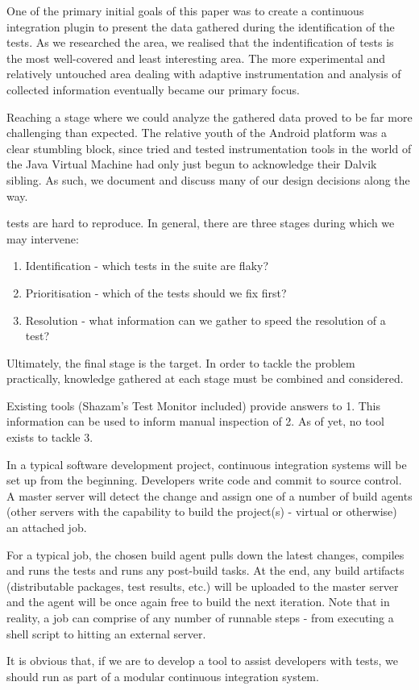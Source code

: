One of the primary initial goals of this paper was to create a continuous
integration plugin to present the data gathered during the identification of the
\flaky tests. As we researched the area, we realised that the indentification of
\flaky tests is the most well-covered and least interesting area. The more
experimental and relatively untouched area dealing with adaptive instrumentation
and analysis of collected information eventually became our primary focus.

Reaching a stage where we could analyze the gathered data proved to be far more
challenging than expected. The relative youth of the Android platform was a
clear stumbling block, since tried and tested instrumentation tools in the world
of the Java Virtual Machine had only just begun to acknowledge their Dalvik
sibling. As such, we document and discuss many of our design decisions along the
way.

\Flaky tests are hard to reproduce. In general, there are three stages during
which we may intervene:
\begin{enumerate}
	\item Identification - which tests in the suite are flaky?
	\item Prioritisation - which of the \flaky tests should we fix first?
	\item Resolution - what information can we gather to speed the resolution of a test?
\end{enumerate}

Ultimately, the final stage is the target. In order to tackle the problem
practically, knowledge gathered at each stage must be combined and considered.

Existing tools (Shazam’s \Flaky Test Monitor included) provide answers to 1.
This information can be used to inform manual inspection of 2. As of yet, no
tool exists to tackle 3.

In a typical software development project, continuous integration systems will
be set up from the beginning. Developers write code and commit to source
control. A master server will detect the change and assign one of a number of
build agents (other servers with the capability to build the project(s) -
virtual or otherwise) an attached job.

For a typical job, the chosen build agent pulls down the latest changes,
compiles and runs the tests and runs any post-build tasks. At the end, any build
artifacts (distributable packages, test results, etc.) will be uploaded to the
master server and the agent will be once again free to build the next iteration.
Note that in reality, a job can comprise of any number of runnable steps - from
executing a shell script to hitting an external server.


It is obvious that, if we are to develop a tool to assist developers with \flaky
tests, we should run as part of a modular continuous integration system.

